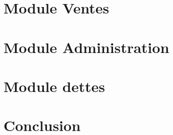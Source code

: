 \documentclass[twoside,UTF8]{EPURapport}
\begin{document}
\chapter{Module Ventes}

\chapter{Module Administration}

\chapter{Module dettes}

\chapter{Conclusion}

\annexes
\end{document}
